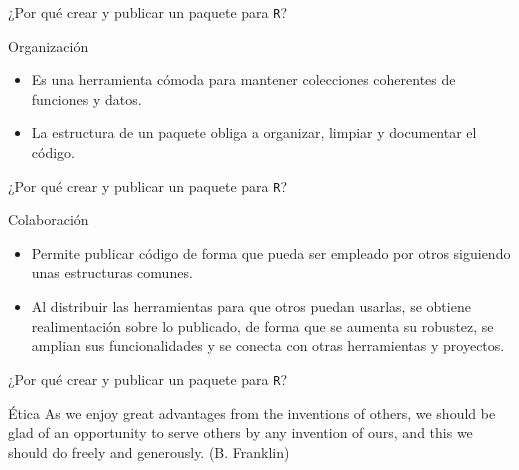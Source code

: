 \documentclass[xcolor={usenames,svgnames,dvipsnames}]{beamer}
\begin{document}
\begin{frame}[label={sec:orge0e58fd},fragile]{¿Por qué crear y publicar un paquete para \texttt{R}?}
 \begin{block}{Organización}
\begin{itemize}
\item Es una herramienta cómoda para mantener \alert{colecciones coherentes de funciones y datos}.
\item La estructura de un paquete \alert{obliga a organizar, limpiar y documentar} el código.
\end{itemize}
\end{block}
\end{frame}

\begin{frame}[label={sec:orgde8dde6},fragile]{¿Por qué crear y publicar un paquete para \texttt{R}?}
 \begin{block}{Colaboración}
\begin{itemize}
\item Permite publicar código de forma que pueda ser \alert{empleado por otros} siguiendo unas \alert{estructuras comunes}.
\item Al distribuir las herramientas para que otros puedan usarlas, se obtiene \alert{realimentación sobre lo publicado}, de forma que se aumenta su \alert{robustez}, se \alert{amplian sus funcionalidades} y se \alert{conecta con otras herramientas} y proyectos.
\end{itemize}
\end{block}
\end{frame}

\begin{frame}[label={sec:org6d00c1b},fragile]{¿Por qué crear y publicar un paquete para \texttt{R}?}
 \begin{block}{Ética}
\guillemotleft{}As we enjoy great advantages from the inventions of others, we should be glad of an opportunity to serve others by any invention of ours, and this we should do freely and generously.\guillemotright{} (B. Franklin)
\end{block}
\end{frame}
\end{document}
